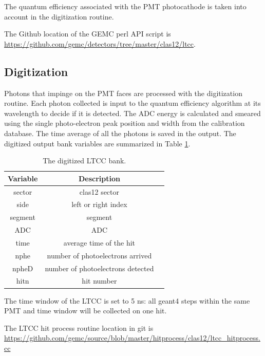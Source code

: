 The quantum efficiency associated with the PMT photocathode is taken into account in
the digitization routine.

The Github location of the GEMC perl API script is  \url{https://github.com/gemc/detectors/tree/master/clas12/ltcc}.


\subsection{Digitization}

Photons that impinge on the PMT faces are processed with the digitization routine.
Each photon collected is input to the quantum efficiency algorithm at its wavelength to decide if it is detected.
The ADC energy is calculated and smeared using the single photo-electron peak position and width from the calibration database.
The time average of all the photons is saved in the output.
The digitized output bank variables are summarized in Table \ref{tab:ltccBank}.

\begin{table}[h]
	\begin{center}
		\begin{tabular}{| c | c | c |}
			\hline \hline
			Variable & Description                                         \\
			\hline
             sector  &                                     clas12 sector   \\
               side  &                               left or right index   \\
            segment  &                                           segment   \\
                ADC  &                                               ADC   \\
               time  &                           average time of the hit   \\
               nphe  &                  number of photoelectrons arrived   \\
              npheD  &                 number of photoelectrons detected   \\
               hitn  &                                        hit number   \\
			\hline \hline
		\end{tabular}
	\end{center}
	\caption{The digitized LTCC bank.}\label{tab:ltccBank}
\end{table}

The time window  of the LTCC is set to 5 ns: all geant4 steps within the same PMT and time window will be collected on one hit.

The LTCC hit process routine location in git is \url{https://github.com/gemc/source/blob/master/hitprocess/clas12/ltcc_hitprocess.cc}
